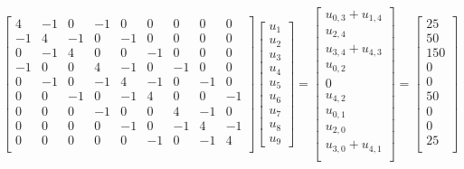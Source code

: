 \documentclass[9pt, aspectratio=169]{beamer}
\begin{document}
\begin{frame}
\[
    \begin{bmatrix}
        4 & -1 & 0 & -1 & 0 & 0 & 0 & 0 & 0 \\
        -1 & 4 & -1 & 0 & -1 & 0 & 0 & 0 & 0  \\
        0 & -1 & 4 & 0 & 0 & -1 & 0 & 0 & 0  \\
        -1 & 0 & 0 & 4 & -1 & 0 & -1 & 0 & 0 \\
        0 & -1 & 0 & -1 & 4 & -1 & 0 & -1 & 0 \\
        0 & 0 & -1 & 0 & -1 & 4 & 0 & 0 & -1 \\
        0 & 0 & 0 & -1 & 0 & 0 & 4 & -1 & 0  \\
        0 & 0 & 0 & 0 & -1 & 0 & -1 & 4 & -1  \\
        0 & 0 & 0 & 0 & 0 & -1 & 0 & -1 & 4  \\
    \end{bmatrix}
    \begin{bmatrix} u_1 \\ u_2 \\ u_3 \\ u_4 \\ u_5 \\ u_6 \\ u_7 \\ u_8 \\ u_9 \end{bmatrix} = 
    \begin{bmatrix}
        u_{0,3} + u_{1,4} \\
        u_{2,4} \\
        u_{3,4} + u_{4,3} \\
        u_{0,2} \\
        0 \\
        u_{4,2} \\
        u_{0,1} \\
        u_{2,0} \\
        u_{3,0} + u_{4,1} \\
    \end{bmatrix}  = 
    \begin{bmatrix}
    25 \\ 50 \\ 150 \\ 0 \\ 0 \\ 50 \\ 0 \\ 0 \\ 25 \\

\end{bmatrix}\]
\end{frame}
\end{document}
